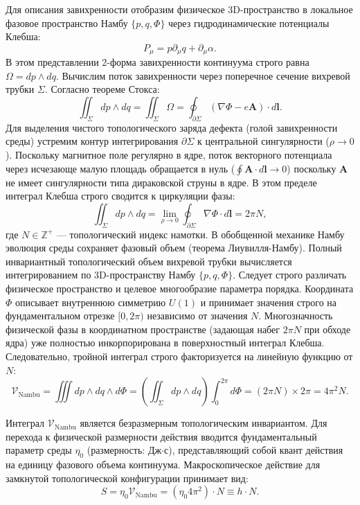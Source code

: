 \documentclass[11pt,a4paper]{article}
\begin{document}
	Для описания завихренности отобразим физическое 3D-пространство в локальное фазовое пространство Намбу $\{p, q, \Phi\}$ через гидродинамические потенциалы Клебша:
	\begin{equation}
		P_\mu = p \partial_\mu q + \partial_\mu \alpha.
	\end{equation}
	В этом представлении 2-форма завихренности континуума строго равна $\Omega = dp \wedge dq$. 
	Вычислим поток завихренности через поперечное сечение вихревой трубки $\Sigma$. Согласно теореме Стокса:
	\begin{equation}
		\iint_\Sigma dp \wedge dq = \iint_\Sigma \Omega = \oint_{\partial \Sigma} (\nabla \Phi - e \mathbf{A}) \cdot d\mathbf{l}.
	\end{equation}
	Для выделения чистого топологического заряда дефекта (голой завихренности среды) устремим контур интегрирования $\partial \Sigma$ к центральной сингулярности ($\rho \to 0$). Поскольку магнитное поле регулярно в ядре, поток векторного потенциала через исчезающе малую площадь обращается в нуль ($\oint \mathbf{A} \cdot d\mathbf{l} \to 0$) поскольку $\mathbf{A}$ не имеет сингулярности типа дираковской струны в ядре. В этом пределе интеграл Клебша строго сводится к циркуляции фазы:
	\begin{equation}
		\iint_\Sigma dp \wedge dq = \lim_{\rho \to 0} \oint_{\partial \Sigma} \nabla \Phi \cdot d\mathbf{l} = 2\pi N,
	\end{equation}
	где $N \in \mathbb{Z}^+$ — топологический индекс намотки.
	В обобщенной механике Намбу эволюция среды сохраняет фазовый объем (теорема Лиувилля-Намбу). Полный инвариантный топологический объем вихревой трубки вычисляется интегрированием по 3D-пространству Намбу $\{p, q, \Phi\}$. 
	Следует строго различать физическое пространство и целевое многообразие параметра порядка. Координата $\Phi$ описывает внутреннюю симметрию $U(1)$ и принимает значения строго на фундаментальном отрезке $[0, 2\pi)$ независимо от значения $N$. Многозначность физической фазы в координатном пространстве (задающая набег $2\pi N$ при обходе ядра) уже полностью инкорпорирована в поверхностный интеграл Клебша. Следовательно, тройной интеграл строго факторизуется на линейную функцию от $N$:
	\begin{equation}
		\mathcal{V}_{\text{Nambu}} = \iiint dp \wedge dq \wedge d\Phi = \left( \iint_\Sigma dp \wedge dq \right) \int_0^{2\pi} d\Phi = (2\pi N) \times 2\pi = 4\pi^2 N.
	\end{equation}
	
	Интеграл $\mathcal{V}_{\text{Nambu}}$ является безразмерным топологическим инвариантом. Для перехода к физической размерности действия вводится фундаментальный параметр среды $\eta_0$ (размерность: Дж$\cdot$с), представляющий собой квант действия на единицу фазового объема континуума. Макроскопическое действие для замкнутой топологической конфигурации принимает вид:
	\begin{equation}
		S = \eta_0 \mathcal{V}_{\text{Nambu}} = (\eta_0 4\pi^2) \cdot N \equiv h \cdot N.
	\end{equation}
	
\end{document}
